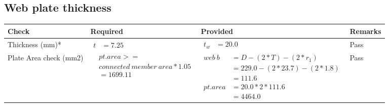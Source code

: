 \documentclass{article}%
\begin{document}
%
\newpage%
\subsection{Web plate thickness}%
\label{subsec:Webplatethickness}%
\renewcommand{\arraystretch}{1.2}%
\begin{longtable}{|p{2.5cm}|p{4.5cm}|p{7cm}|p{1.5cm}|}%
\hline%
\rowcolor{OsdagGreen}%
Check&Required&Provided&Remarks\\%
\hline%
\endhead%
\hline%
Thickness (mm)*&$\begin{aligned} t &=7.25\end{aligned}$&$\begin{aligned} t_w &=20.0\end{aligned}$&Pass\\%
\hline%
Plate Area check (mm2)&$\begin{aligned} &pt.area >= \\&connected~member~area * 1.05\\  &= 1699.11\end{aligned}$&$\begin{aligned} web~b &= D-(2*T)-(2*r_1)\\ &=229.0-(2*23.7)-(2*1.8)\\ &= 111.6 \\  pt.area &= 20.0*2* 111.6\\ &= 4464.0\end{aligned}$&Pass\\%
\hline%
\end{longtable}

%
\newpage%
\end{document}
